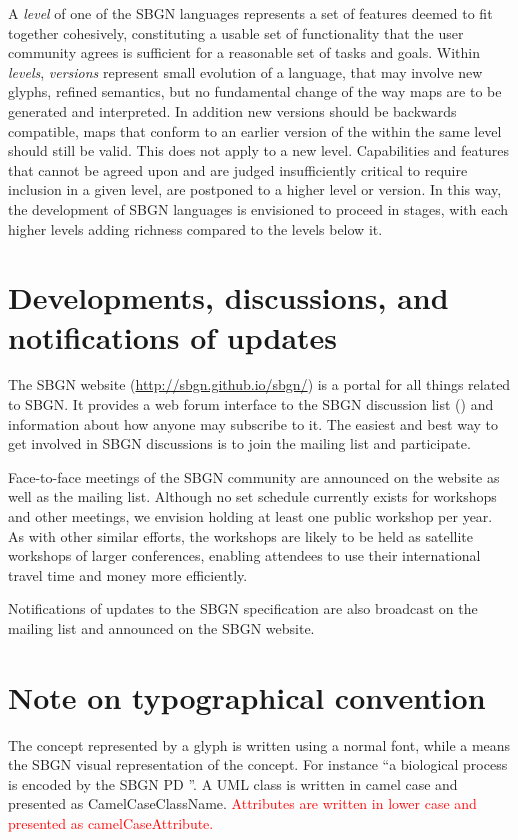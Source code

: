 A \emph{level} of one of the SBGN languages represents a set of features 
deemed to fit together cohesively, constituting a usable set of 
functionality that the user community agrees is sufficient for a reasonable 
set of tasks and goals. Within \emph{levels}, \emph{versions} represent 
small evolution of a language, that may involve new glyphs, refined 
semantics, but no fundamental change of the way maps are to be generated 
and interpreted. In addition new versions should be backwards compatible, 
\ie \PD maps that conform to an earlier version of the \PDl within 
the same level should still be valid. This does not apply to a new level.
Capabilities and features that cannot be agreed upon and 
are judged insufficiently critical to require inclusion in a given level, 
are postponed to a higher level or version.  In this way, the development 
of SBGN languages is envisioned to proceed in stages, with each higher 
levels adding richness compared to the levels below it.

\section{Developments, discussions, and notifications of updates}
\label{sec:discussions}

The SBGN website (\url{http://sbgn.github.io/sbgn/}) is a portal for all things 
related to SBGN.  It provides a web forum interface to the SBGN discussion 
list () and information about how anyone 
may subscribe to it.  The easiest and best way to get involved in SBGN 
discussions is to join the mailing list and participate.

Face-to-face meetings of the SBGN community are announced on the website as 
well as the mailing list.  Although no set schedule currently exists for 
workshops and other meetings, we envision holding at least one public 
workshop per year.  As with other similar efforts, the workshops are likely 
to be held as satellite workshops of larger conferences, enabling attendees 
to use their international travel time and money more efficiently.

Notifications of updates to the SBGN specification are also broadcast on 
the mailing list and announced on the SBGN website.

\section{Note on typographical convention}
The concept represented by a glyph is written using a normal font, while a 
 means the SBGN visual representation of the concept. For 
instance ``a biological process is encoded by the SBGN PD ''.
A UML class is written in camel case and presented as CamelCaseClassName.
\textcolor{red}{Attributes are written in lower case and presented as camelCaseAttribute.}


